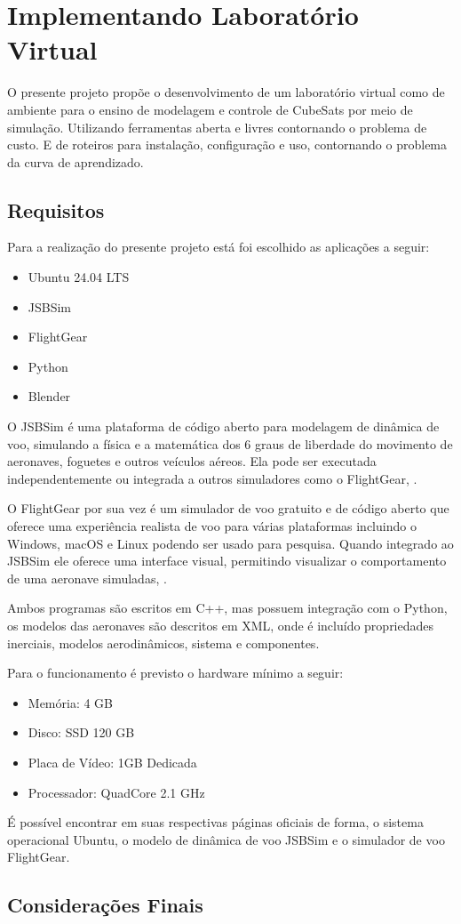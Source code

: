 \chapter{Implementando Laboratório Virtual}\label{cap:proposta}

O presente projeto propõe o desenvolvimento de um laboratório virtual como de ambiente para o ensino de modelagem e controle de CubeSats por meio de simulação. Utilizando ferramentas aberta e livres contornando o problema de custo. E de roteiros para instalação, configuração e uso, contornando o problema da curva de aprendizado.

\section{Requisitos}\label{Requisitos}

Para a realização do presente projeto está foi escolhido as aplicações a seguir:

\begin{itemize}
    \item Ubuntu 24.04 LTS
    \item JSBSim
    \item FlightGear
    \item Python
    \item Blender
\end{itemize}

O JSBSim é uma plataforma de código aberto para modelagem de dinâmica de voo, simulando a física e a matemática dos 6 graus de liberdade do movimento de aeronaves, foguetes e outros veículos aéreos. Ela pode ser executada independentemente ou integrada a outros simuladores como o FlightGear, .

O FlightGear por sua vez é um simulador de voo gratuito e de código aberto que oferece uma experiência realista de voo para várias plataformas incluindo o Windows, macOS e Linux podendo ser usado para pesquisa. Quando integrado ao JSBSim ele oferece uma interface visual, permitindo visualizar o comportamento de uma aeronave simuladas, .

Ambos programas são escritos em C++, mas possuem integração com o Python, os modelos das aeronaves são descritos em XML, onde é incluído propriedades inerciais, modelos aerodinâmicos, sistema e componentes.

Para o funcionamento é previsto o hardware mínimo a seguir:

\begin{itemize}
    \item Memória: 4 GB
    \item Disco: SSD 120 GB
    \item Placa de Vídeo: 1GB Dedicada
    \item Processador: QuadCore 2.1 GHz
\end{itemize}

É possível encontrar em suas respectivas páginas oficiais de forma, o sistema operacional Ubuntu, o modelo de dinâmica de voo JSBSim e o simulador de voo FlightGear.

\section{Considerações Finais}



